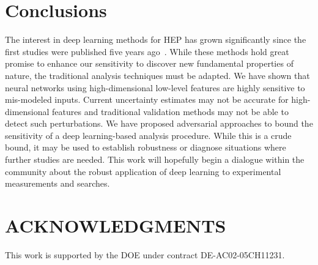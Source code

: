 \documentclass[reprint,nofootinbib,...]{revtex4-1}
\begin{document}

\clearpage

\section{Conclusions}

The interest in deep learning methods for HEP has grown significantly since the first studies were published five years ago~\cite{Baldi:2014kfa}.  While these methods hold great promise to enhance our sensitivity to discover new fundamental properties of nature, the traditional analysis techniques must be adapted.  We have shown that neural networks using high-dimensional low-level features are highly sensitive to mis-modeled inputs.  Current uncertainty estimates may not be accurate for high-dimensional features and traditional validation methods may not be able to detect such perturbations.  We have proposed adversarial approaches to bound the sensitivity of a deep learning-based analysis procedure.  While this is a crude bound, it may be used to establish robustness or diagnose situations where further studies are needed.  This work will hopefully begin a dialogue within the community about the robust application of deep learning to experimental measurements and searches.

\section*{ACKNOWLEDGMENTS}

This work is supported by the DOE under contract DE-AC02-05CH11231. 


\end{document}
